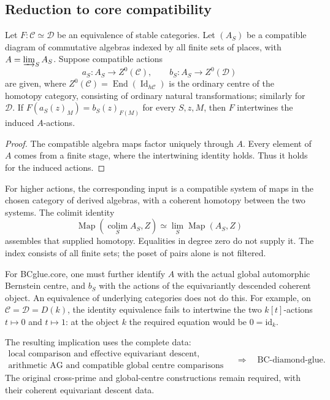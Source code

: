 \subsection{Reduction to core compatibility}

\begin{theorem}
\label{v4-arith:bcglue-k5:thm:core-compatibility}
Let \(F:\mathcal C\simeq\mathcal D\) be an equivalence of stable
categories. Let \((A_S)\) be a compatible diagram of commutative
algebras indexed by all finite sets of places, with
\(A=\varinjlim_S A_S\). Suppose compatible actions
\[
 a_S:A_S\to Z^0(\mathcal C),\qquad b_S:A_S\to Z^0(\mathcal D)
\]
are given, where \(Z^0(\mathcal C)=\operatorname{End}(\operatorname{Id}_{h\mathcal C})\)
is the ordinary centre of the homotopy category, consisting of ordinary
natural transformations; similarly for \(\mathcal D\). If
\(F(a_S(z)_M)=b_S(z)_{F(M)}\) for every \(S,z,M\), then \(F\)
intertwines the induced \(A\)-actions.
\end{theorem}
\begin{proof}
The compatible algebra maps factor uniquely through \(A\). Every
element of \(A\) comes from a finite stage, where the intertwining
identity holds. Thus it holds for the induced actions.
\end{proof}
\begin{remark}
\label{v4-arith:bcglue-k5:rem:core-vs-unconditional}
For higher actions, the corresponding input is a compatible system
of maps in the chosen category of derived algebras, with a coherent
homotopy between the two systems. The colimit identity
\[
 \operatorname{Map}(\operatorname*{colim}_S A_S,Z)
 \simeq\operatorname*{lim}_S\operatorname{Map}(A_S,Z)
\]
assembles that supplied homotopy. Equalities in degree zero do not
supply it. The index consists of all finite sets; the poset of pairs
alone is not filtered.

For BCglue.core, one must further identify \(A\) with the actual
global automorphic Bernstein centre, and \(b_S\) with the actions
of the equivariantly descended coherent object. An equivalence of
underlying categories does not do this. For example, on
\(\mathcal C=\mathcal D=D(k)\), the identity equivalence fails to
intertwine the two \(k[t]\)-actions \(t\mapsto0\) and
\(t\mapsto1\): at the object \(k\) the required equation would be
\(0=\mathrm{id}_k\).

The resulting implication uses the complete data:
\[
 \begin{gathered}
 \text{local comparison and effective equivariant descent,}\\
 \text{arithmetic AG and compatible global centre comparisons}
 \end{gathered}
 \quad\Longrightarrow\quad\text{BC-diamond-glue}.
\]
The original cross-prime and global-centre constructions remain
required, with their coherent equivariant descent data.
\end{remark}

